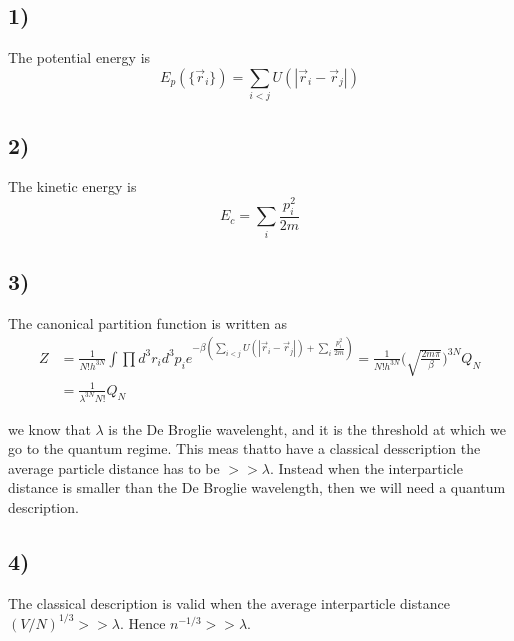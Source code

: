 \documentclass[10pt,a4paper]{book}
\begin{document}
\subsection*{1)}
The potential energy is
$$E_p(\{\vec{r}_i\})=\sum_{i<j}U(|\vec{r}_i-\vec{r}_j|)$$
\subsection*{2)}
The kinetic energy is 
$$E_c=\sum_i \frac{p_i^2}{2m}$$

\subsection*{3)}
The canonical partition function is written as
\begin{align*}
Z&=\frac{1}{N!h^{3N}}\int \prod d^3r_id^3p_i e^{-\beta(\sum_{i<j}U(|\vec{r}_i-\vec{r}_j|)+\sum_i \frac{p_i^2}{2m})}=\frac{1}{N!h^{3N}}\bigg(\sqrt{\frac{2m\pi}{\beta}}\bigg)^{3N}Q_N\\
&=\frac{1}{\lambda^{3N}N!}Q_N
\end{align*}

we know that $\lambda$ is the De Broglie wavelenght, and it is the threshold at which we go to the quantum regime. This meas thatto have a classical desscription the average particle distance has to be $>>\lambda$. Instead when the interparticle distance is smaller than the De Broglie wavelength, then we will need a quantum description.


\subsection*{4)}
The classical description is valid when the average interparticle distance $(V/N)^{1/3}>>\lambda$. Hence $n^{-1/3}>>\lambda$. 
\end{document}
